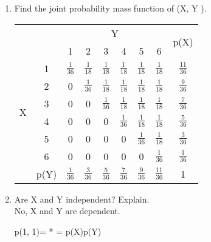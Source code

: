 \documentclass[fleqn]{article}
\begin{document}
\begin{enumerate}
	

	\begin{enumerate}
	\item %
	Find the joint probability mass function of (X, Y ).
	
		\begin{tabular}{|cc|c|c|c|c|c|c|c|}
		
		\cline{1-9}
		& & \multicolumn{6}{c|}{Y}  &
		\multicolumn{1}{c|}{\multirow{2}{*}{p(X)}} 	\\  \cline{1-8}
		& &1 &2 &3 &4 &5 &6 &|		    \\	\cline{3-9}
		

		\multicolumn{1}{|c}{\multirow{6}{*}{X}}		&
		\multicolumn{1}{|c|}{1}		
		& $\frac{1}{36}$  & $\frac{1}{18}$ & $\frac{1}{18}$
		& $\frac{1}{18}$  & $\frac{1}{18}$ & $\frac{1}{18}$		
		& $\frac{11}{36}$										\\ \cline{3-9} &
		\multicolumn{1}{|c|}{2}
		&0 				  & $\frac{1}{36}$ & $\frac{1}{18}$ 
		& $\frac{1}{18}$  & $\frac{1}{18}$ & $\frac{1}{18}$		
		& $\frac{9}{36}$										\\ \cline{3-9} &
		\multicolumn{1}{|c|}{3}
		&0 				  & 0			   & $\frac{1}{36}$ 
		& $\frac{1}{18}$  & $\frac{1}{18}$ & $\frac{1}{18}$		
		& $\frac{7}{36}$										\\ \cline{3-9} &
		\multicolumn{1}{|c|}{4}
		&0 				  & 0			   & 0
		& $\frac{1}{36}$  & $\frac{1}{18}$ & $\frac{1}{18}$		
		& $\frac{5}{36}$										\\ \cline{3-9} &
		\multicolumn{1}{|c|}{5}
		&0 				  & 0 				& 0
		& 0				  & $\frac{1}{36}$ & $\frac{1}{18}$		
		& $\frac{3}{36}$										\\ \cline{3-9} &
		\multicolumn{1}{|c|}{6}
		&0 				  & 0			   & 0 
		&0				  & 0			   & $\frac{1}{36}$		
		& $\frac{1}{36}$										\\ \cline{1-9} &
		\multicolumn{1}{c|}{p(Y)}
		& $\frac{1}{36}$	& $\frac{3}{36}$	& $\frac{5}{36}$
		& $\frac{7}{36}$	& $\frac{9}{36}$	& $\frac{11}{36}$ 
		& 1
																\\  \cline{1-9}	
		\end{tabular}	
	 
	\item %
	Are X and Y independent? Explain.
	\\No, X and Y are dependent.
		\begin{flalign*}		
		p(1, 1)=  \neq {}* = p(X)p(Y)
		\end{flalign*}
		

\end{enumerate}
\end{enumerate}
\end{document}
